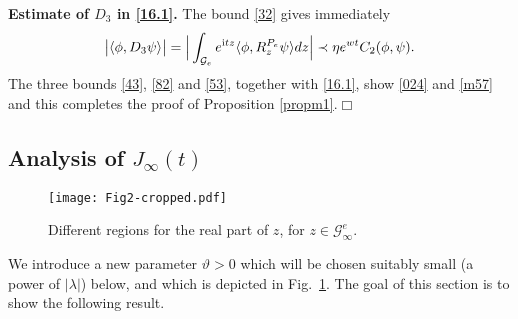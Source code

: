 \documentclass[letterpaper,onecolumn,11pt,accepted=2021-12-09]{quantumarticle}
\numberwithin{equation}{section}
\renewcommand{\i}{{\rm i}}
\def\qed{\hfill $\Box$\medskip}
\begin{document}
\medskip

\noindent
{\bf Estimate of $D_3$ in \eqref{16.1}. }  The bound \eqref{32}  gives immediately 
\begin{equation}
	\label{53}
\big|\langle \phi, D_3\psi\rangle\big| = \Big| \int_{{\mathcal G}_e}e^{\i tz} \langle\phi,R_z^{P_e}\psi\rangle dz\Big|  \prec \eta e^{wt} C_2(\phi,\psi).
\end{equation}
The three bounds \eqref{43}, \eqref{82} and \eqref{53}, together with \eqref{16.1}, show \eqref{024} and \eqref{m57} and this completes the proof of Proposition \ref{propm1}.\hfill \qed




\subsection{Analysis of  $J_\infty(t)$}
\label{sect4.2}



\begin{figure}[b]
	\centering
	\texttt{[image: Fig2-cropped.pdf]}
	\caption{ Different regions for the real part of $z$, for  $z\in {\mathcal G}_\infty^e$.}
	\label{Fig4}
\end{figure}



We introduce a new parameter $\vartheta>0$ which will be chosen suitably small (a power of $|\lambda|$) below, and which is depicted in Fig.~\ref{Fig4}. The goal of this section is to show the following result.
\end{document}
